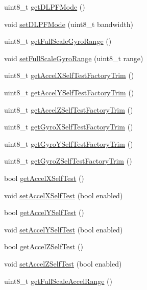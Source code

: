 \begin{DoxyCompactItemize}
uint8\+\_\+t \mbox{\hyperlink{classMPU6050_a9f2737fe22955fd85b2575ba8da874c6}{get\+D\+L\+P\+F\+Mode}} ()
\item 
void \mbox{\hyperlink{classMPU6050_a7a782ade8af2f88dfef7171487f59a3b}{set\+D\+L\+P\+F\+Mode}} (uint8\+\_\+t bandwidth)
\item 
uint8\+\_\+t \mbox{\hyperlink{classMPU6050_acb1fa088d43d76230106a3226f343013}{get\+Full\+Scale\+Gyro\+Range}} ()
\item 
void \mbox{\hyperlink{classMPU6050_a72afc0b6f221c9336f635b5637c62dae}{set\+Full\+Scale\+Gyro\+Range}} (uint8\+\_\+t range)
\item 
uint8\+\_\+t \mbox{\hyperlink{classMPU6050_a0cfaa7fbf63fb5867e003d490eb3fd96}{get\+Accel\+X\+Self\+Test\+Factory\+Trim}} ()
\item 
uint8\+\_\+t \mbox{\hyperlink{classMPU6050_ae219dc9651d4d42a918e553b03e4e7bf}{get\+Accel\+Y\+Self\+Test\+Factory\+Trim}} ()
\item 
uint8\+\_\+t \mbox{\hyperlink{classMPU6050_a455f63be2ea810cac26d583da6915050}{get\+Accel\+Z\+Self\+Test\+Factory\+Trim}} ()
\item 
uint8\+\_\+t \mbox{\hyperlink{classMPU6050_a9e50a2644c5ac8c9ac4270c86fd18a93}{get\+Gyro\+X\+Self\+Test\+Factory\+Trim}} ()
\item 
uint8\+\_\+t \mbox{\hyperlink{classMPU6050_ae3e0610d6d3bb8162c4d5c99e0f53106}{get\+Gyro\+Y\+Self\+Test\+Factory\+Trim}} ()
\item 
uint8\+\_\+t \mbox{\hyperlink{classMPU6050_a6aecb64dc804f1238e56626ae13b4c79}{get\+Gyro\+Z\+Self\+Test\+Factory\+Trim}} ()
\item 
bool \mbox{\hyperlink{classMPU6050_a8fc7eab1302281f6e4bc953379f3237b}{get\+Accel\+X\+Self\+Test}} ()
\item 
void \mbox{\hyperlink{classMPU6050_ac2ab843dc9d241056ed0f891195cdbf9}{set\+Accel\+X\+Self\+Test}} (bool enabled)
\item 
bool \mbox{\hyperlink{classMPU6050_a2523e798db3baf9cb9dbf347af16639b}{get\+Accel\+Y\+Self\+Test}} ()
\item 
void \mbox{\hyperlink{classMPU6050_ad5847430ab297959e4d0e9b81ba2e3ba}{set\+Accel\+Y\+Self\+Test}} (bool enabled)
\item 
bool \mbox{\hyperlink{classMPU6050_a57710638eeb6176cf14a8c444bda5300}{get\+Accel\+Z\+Self\+Test}} ()
\item 
void \mbox{\hyperlink{classMPU6050_a8eb8ba039af9a47e0475a3835b87f404}{set\+Accel\+Z\+Self\+Test}} (bool enabled)
\item 
uint8\+\_\+t \mbox{\hyperlink{classMPU6050_a0fe2dad60c170cee7d614e08f243ffd0}{get\+Full\+Scale\+Accel\+Range}} ()

\end{DoxyCompactItemize}
